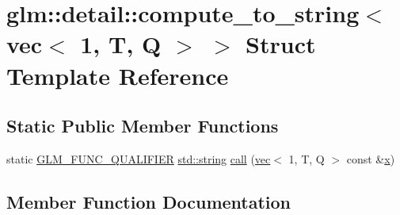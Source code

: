 \hypertarget{structglm_1_1detail_1_1compute__to__string_3_01vec_3_011_00_01_t_00_01_q_01_4_01_4}{}\section{glm\+:\+:detail\+:\+:compute\+\_\+to\+\_\+string$<$ vec$<$ 1, T, Q $>$ $>$ Struct Template Reference}
\label{structglm_1_1detail_1_1compute__to__string_3_01vec_3_011_00_01_t_00_01_q_01_4_01_4}
\subsection*{Static Public Member Functions}
\begin{DoxyCompactItemize}
\item 
static \hyperlink{setup_8hpp_a33fdea6f91c5f834105f7415e2a64407}{G\+L\+M\+\_\+\+F\+U\+N\+C\+\_\+\+Q\+U\+A\+L\+I\+F\+I\+ER} \hyperlink{_s_d_l__opengl__glext_8h_ae84541b4f3d8e1ea24ec0f466a8c568b}{std\+::string} \hyperlink{structglm_1_1detail_1_1compute__to__string_3_01vec_3_011_00_01_t_00_01_q_01_4_01_4_ad8aa70be55855aba1c6c6796caf5b0cf}{call} (\hyperlink{structglm_1_1vec}{vec}$<$ 1, T, Q $>$ const \&\hyperlink{_s_d_l__opengl_8h_ad0e63d0edcdbd3d79554076bf309fd47}{x})
\end{DoxyCompactItemize}


\subsection{Member Function Documentation}
\mbox{\label{structglm_1_1detail_1_1compute__to__string_3_01vec_3_011_00_01_t_00_01_q_01_4_01_4_ad8aa70be55855aba1c6c6796caf5b0cf}} 
